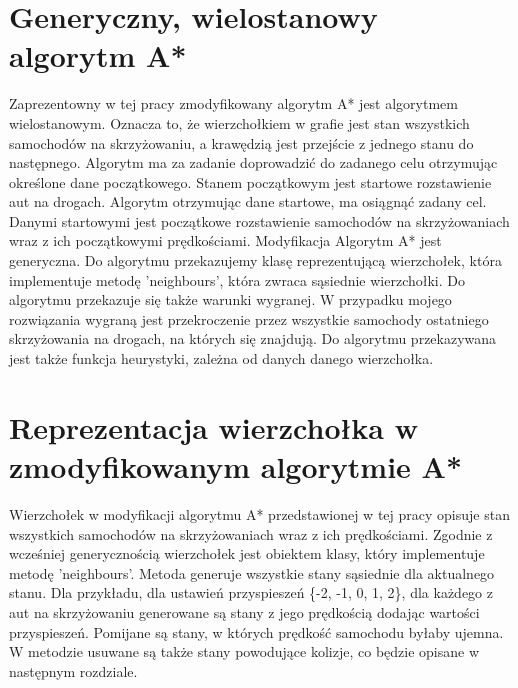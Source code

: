 \section{Generyczny, wielostanowy algorytm A*}

Zaprezentowny w tej pracy zmodyfikowany algorytm A* jest algorytmem wielostanowym. Oznacza to, że wierzchołkiem w grafie jest stan wszystkich samochodów na skrzyżowaniu, a krawędzią jest przejście z jednego stanu do następnego.
\newline
\newline
Algorytm ma za zadanie doprowadzić do zadanego celu otrzymując określone dane początkowego. Stanem początkowym jest startowe rozstawienie aut na drogach.
\newline
\newline
Algorytm otrzymując dane startowe, ma osiągnąć zadany cel. Danymi startowymi jest początkowe rozstawienie samochodów na skrzyżowaniach wraz z ich początkowymi prędkościami.
\newline
\newline
Modyfikacja Algorytm A* jest generyczna. Do algorytmu przekazujemy klasę reprezentującą wierzchołek, która implementuje metodę 'neighbours', która zwraca sąsiednie wierzchołki.
\newline
\newline
Do algorytmu przekazuje się także warunki wygranej. W przypadku mojego rozwiązania wygraną jest przekroczenie przez wszystkie samochody ostatniego skrzyżowania na drogach, na których się znajdują.
\newline
\newline
Do algorytmu przekazywana jest także funkcja heurystyki, zależna od danych danego wierzchołka.

\section{Reprezentacja wierzchołka w zmodyfikowanym algorytmie A*}

Wierzchołek w modyfikacji algorytmu A* przedstawionej w tej pracy opisuje stan wszystkich samochodów na skrzyżowaniach wraz z ich prędkościami.
\newline
\newline
Zgodnie z wcześniej generycznością wierzchołek jest obiektem klasy, który implementuje metodę 'neighbours'. Metoda generuje wszystkie stany sąsiednie dla aktualnego stanu. Dla przykładu, dla ustawień przyspieszeń \{-2, -1, 0, 1, 2\}, dla każdego z aut na skrzyżowaniu generowane są stany z jego prędkością dodając wartości przyspieszeń. Pomijane są stany, w których prędkość samochodu byłaby ujemna.
\newline
\newline
W metodzie usuwane są także stany powodujące kolizje, co będzie opisane w następnym rozdziale.

